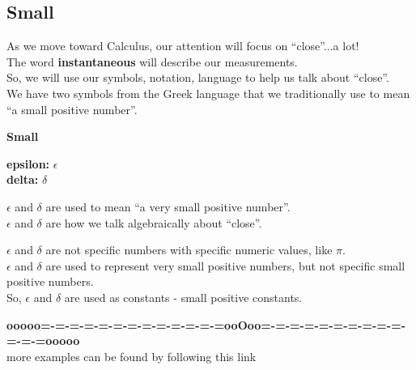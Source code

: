 \documentclass{ximera}
\begin{document}
\subsection{Small}



As we move toward Calculus, our attention will focus on ``close''...a lot! \\


The word \textbf{instantaneous} will describe our measurements. \\


So, we will use our symbols, notation, language to help us talk about ``close''. \\


We have two symbols from the Greek language that we traditionally use to mean ``a small positive number''. \\



\begin{notation} \textbf{\textcolor{red!80!black}{Small}} 


\textbf{\textcolor{blue!55!black}{epsilon:}}  $\epsilon$ \\

\textbf{\textcolor{blue!55!black}{delta:}}  $\delta$ \\


\end{notation}

$\epsilon$ and $\delta$ are used to mean ``a very small positive number''. \\  


$\epsilon$ and $\delta$ are how we talk algebraically about ``close''. \\





\begin{warning}


$\epsilon$ and $\delta$ are not specific numbers with specific numeric values, like $\pi$. \\


$\epsilon$ and $\delta$ are used to represent very small positive numbers, but not specific small positive numbers. \\


So, $\epsilon$ and $\delta$ are used as constants - small positive constants.





\end{warning}








\begin{center}
\textbf{\textcolor{green!50!black}{ooooo=-=-=-=-=-=-=-=-=-=-=-=-=ooOoo=-=-=-=-=-=-=-=-=-=-=-=-=ooooo}} \\

more examples can be found by following this link\\ 

\end{center}
\end{document}
